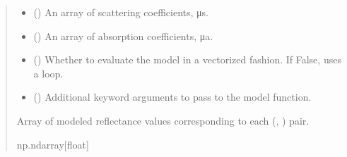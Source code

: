 \documentclass[letterpaper,10pt,english]{sphinxmanual}
\begin{document}
\begin{fulllineitems}
\begin{quote}
\begin{description}
\begin{itemize}
\item {} 
\sphinxAtStartPar
{} (\sphinxstyleliteralemphasis{\sphinxupquote{{[}}}\sphinxstyleliteralemphasis{\sphinxupquote{{]}}}) \textendash{} An array of scattering coefficients, μs.

\item {} 
\sphinxAtStartPar
{} (\sphinxstyleliteralemphasis{\sphinxupquote{{[}}}\sphinxstyleliteralemphasis{\sphinxupquote{{]}}}) \textendash{} An array of absorption coefficients, μa.

\item {} 
\sphinxAtStartPar
{} () \textendash{} Whether to evaluate the model in a vectorized fashion. If False, uses a loop.

\item {} 
\sphinxAtStartPar
{} () \textendash{} Additional keyword arguments to pass to the model function.

\end{itemize}

\sphinxAtStartPar
Array of modeled reflectance values corresponding to each (, ) pair.

\sphinxAtStartPar
np.ndarray{[}float{]}

\end{description}\end{quote}

\end{fulllineitems}

\end{document}
